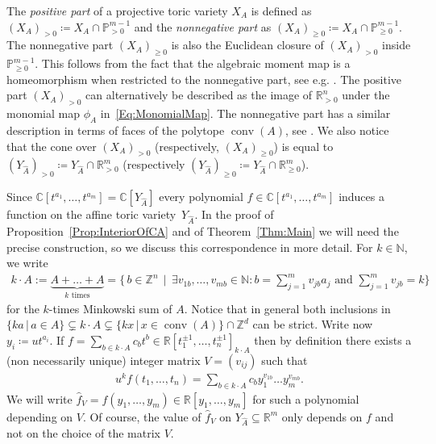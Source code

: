 \documentclass[a4paper,11pt]{amsart}
\theoremstyle{definition}
\DeclareMathOperator{\conv}{conv}
\newcommand{\ZZ}{\mathbb{Z}}
\newcommand{\RR}{\mathbb{R}}
\newcommand{\CC}{\mathbb{C}}
\begin{document}
The \emph{positive part} of a projective toric variety $X_A$ is defined as $(X_A)_{>0} \coloneqq X_A \cap \mathbb{P}_{>0}^{m-1}$ and the \emph{nonnegative part} as $(X_A)_{\ge 0} \coloneqq X_A \cap \mathbb{P}_{\ge 0}^{m-1}$. The nonnegative part $(X_A)_{\geq0}$ is also the Euclidean closure of $(X_A)_{>0}$ inside $\mathbb{P}_{\geq0}^{m-1}$. 
This follows from the fact that the algebraic moment map is a homeomorphism when restricted to the nonnegative part, see e.g. \cite[Th.~12.5.2]{CoxLittleSchenck}. The positive part $(X_A)_{>0}$ can alternatively be described as the image of $\mathbb{R}^n_{>0}$ under the monomial map $\phi_{A}$ in~\eqref{Eq:MonomialMap}. 
The nonnegative part has a similar description in terms of faces of the polytope $\conv(A)$, see \cite[Section 5.1]{TelenBook}. 
We also notice that the cone over $(X_A)_{>0}$ (respectively, $(X_A)_{\ge 0}$) is equal to $(Y_{\hat{A}})_{>0} \coloneqq Y_{\hat{A}} \cap \RR_{>0}^m$ (respectively $(Y_{\hat{A}})_{\geq 0} \coloneqq Y_{\hat{A}} \cap \RR_{\geq 0}^m$).

Since $\CC[t^{a_1}, \dots, t^{a_m}] = \CC[Y_{\hat{A}}]$
every polynomial $f \in \CC[t^{a_1}, \dots, t^{a_m}]$ induces a function on the affine toric variety~$Y_{\hat{A}}$.
In the proof of Proposition~\ref{Prop:InteriorOfCA} and of Theorem~\ref{Thm:Main} we will need the precise construction, so we discuss this correspondence in more detail.
For $k \in \mathbb{N}$, we write
\begin{align}
\label{Eq:MinkowskiAk}
 k \cdot A := \underbrace{A + \dots + A}_{k \text{ times}} = \big\{ \, b \in \mathbb{Z}^n \, \mid \, \exists v_{1 b}, \dots, v_{m b} \in \mathbb{N}\colon b = \sum_{j=1}^m v_{j b} a_j \text{ and }  \sum_{j=1}^m v_{j b} = k \big\} 
\end{align}
for the $k$-times Minkowski sum of $A$. Notice that in general both inclusions in $\{ka\,|\,a\in A\}\subsetneq k \cdot A\subsetneq \{kx\,|\,x\in \conv(A)\}\cap \ZZ^d$ can be strict.
Write now $y_i \coloneqq u t^{a_i}$. If $f = \sum_{b \in k \cdot A} c_b t^b \in \RR[t_1^{\pm 1}, \dots , t_n^{\pm 1}]_{k \cdot A}$ then by definition there exists a (non necessarily unique) integer matrix $V = (v_{ij})$ such that
\begin{align}
\label{eq:DefV}
    u^k f(t_1, \dots , t_n) = \sum_{b \in k\cdot A} c_b y_1^{v_{1 b}} \dots y_m^{v_{m b}}.
\end{align}
We will write $\hat{f}_V = f(y_1, \dots , y_m) \in \RR[y_1, \dots , y_m]$ for such a polynomial depending on $V$. Of course, the value of $\hat{f}_V$ on $Y_{\hat{A}} \subseteq \RR^m$ only depends on $f$ and not on the choice of the matrix $V$.
\end{document}
